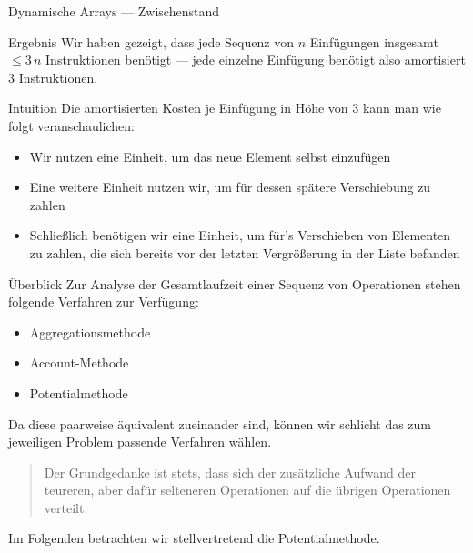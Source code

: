 \begin{frame}{Dynamische Arrays --- Zwischenstand}
\begin{block}{Ergebnis}
Wir haben gezeigt, dass jede Sequenz von $n$ Einf\"ugungen insgesamt $\leq 3 \, n$ Instruktionen ben\"otigt --- jede einzelne Einf\"ugung ben\"otigt also \alert{amortisiert} $3$ Instruktionen.
\end{block}

\begin{block}{Intuition}
Die amortisierten Kosten je Einf\"ugung in H\"ohe von $3$ kann man wie folgt veranschaulichen:
\begin{itemize}
    \item Wir nutzen eine Einheit, um \alert{das neue Element selbst einzuf\"ugen}
    \item Eine weitere Einheit nutzen wir, um f\"ur \alert{dessen sp\"atere Verschiebung} zu zahlen
    \item Schlie{\ss}lich ben\"otigen wir eine Einheit, um f\"ur's Verschieben von Elementen zu zahlen, die sich bereits \alert{vor der letzten Vergr\"o{\ss}erung} in der Liste befanden
\end{itemize}
\end{block}
\end{frame}

\begin{frame}{\"Uberblick}
Zur Analyse der Gesamtlaufzeit einer \alert{Sequenz von Operationen} stehen folgende Verfahren zur Verf\"ugung:
\begin{itemize}
    \item Aggregationsmethode
    \item Account-Methode
    \item Potentialmethode
\end{itemize}
Da diese paarweise \alert{\"aquivalent} zueinander sind, k\"onnen wir schlicht das zum jeweiligen Problem passende Verfahren w\"ahlen.

\begin{quote}
    Der Grundgedanke ist stets, dass sich der zus\"atzliche Aufwand der \alert{teureren}, aber daf\"ur \alert{selteneren} Operationen auf die \"ubrigen Operationen \alert{verteilt}.
\end{quote}

Im Folgenden betrachten wir stellvertretend die \alert{Potentialmethode}.
\end{frame}

